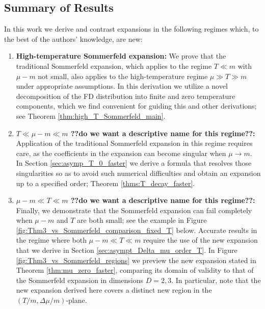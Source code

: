 \documentclass[sn-mathphys,Numbered]{sn-jnl}
\newcommand*{\xblue}{\color{blue}}
\begin{document}
\subsection{Summary of Results}
In this work we derive and contrast expansions in the following regimes which, to the best of the authors' knowledge, are new:
\begin{enumerate}
\item {\bf High-temperature Sommerfeld expansion:}  We prove that the traditional Sommerfeld expansion, which applies to the regime $T\ll m$ with $\mu-m$ not small, also applies to the high-temperature regime $\mu\gg T\gg m$ under appropriate assumptions.  In this derivation we utilize a novel decomposition of the FD distribution into finite and zero temperature components, which we find convenient for guiding this and other derivations; see  Theorem \ref{thm:high_T_Sommerfeld_main}.  
\item {\bf  $T\ll \mu-m\ll m$ ??do we want a descriptive name for this regime??:\xblue{How about the name: Nonrelativistic degenerate Fermi gas region?}}   Application of the traditional Sommerfeld expansion in this regime requires care, as the coefficients in the expansion can become singular when $\mu\to m$.  In Section \ref{sec:asymp_T_0_faster}  we derive a formula that  resolves those singularities so as to avoid such numerical difficulties and obtain an expansion up to a specified order; Theorem \ref{thms:T_decay_faster}.
\item {\bf  $\mu-m\ll T\ll m$ ??do we want a descriptive name for this regime??:\xblue{How about the name: Nonrelativistic Fermi gas region?}} Finally, we demonstrate that the Sommerfeld expansion can fail completely when  $\mu-m$ and $T$ are both small; see  the example in Figure \ref{fig:Thm3_vs_Sommerfeld_comparison_fixed_T} below. Accurate results in the regime where both $\mu-m\ll T\ll m$   require the use of the new expansion that we derive in Section \ref{sec:asympt_Delta_mu_order_T}.  In Figure \ref{fig:Thm3_vs_Sommerfeld_regions} we preview the new expansion stated in Theorem \ref{thm:mu_zero_faster}, comparing its domain of validity to that of the  Sommerfeld expansion  in dimensions $D=2,3$.  In particular, note that the new expansion derived here covers a distinct new region in the $(T/m,\Delta\mu/m)$-plane. 
\end{enumerate}
\end{document}
